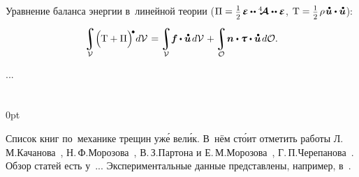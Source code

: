 \begin{otherlanguage}{russian}

Уравнение баланса энергии в~линейной теории (${\Pi = \smash{\smalldisplaystyleonehalf} \hspace{.25ex} \mathboldepsilon \hspace{-0.1ex} \dotdotp \stiffnesstensor \dotdotp \mathboldepsilon}$, ${\mathrm{T} = \smash{\smalldisplaystyleonehalf} \hspace{.25ex} \rho \hspace{.2ex} \mathdotabove{\bm{u}} \dotp \mathdotabove{\bm{u}}}$):

\nopagebreak\vspace{-0.1em}\begin{equation}
\integral\displaylimits_{\mathcal{V}} \hspace{-0.42ex} \left(^{\mathstrut} \hspace{-0.2ex} \mathrm{T} + \Pi \right)^{\hspace{-0.12em}\tikz[baseline=-0.2ex] \draw[black, fill=black] (0,0) circle (.28ex);} \hspace{-0.25ex} d\mathcal{V} \hspace{.2ex}
= \hspace{-0.1ex}
\integral\displaylimits_{\mathcal{V}} \hspace{-0.5ex} \bm{f} \hspace{-0.1ex} \dotp \mathdotabove{\bm{u}} \hspace{.25ex} d\mathcal{V} \hspace{.16ex}
+ \hspace{-0.1ex}
\integral\displaylimits_{\mathcal{O}} \hspace{-0.32ex} \bm{n} \dotp \mathboldtau \dotp \mathdotabove{\bm{u}} \hspace{.25ex} d\mathcal{O} .
\end{equation}

...



\end{otherlanguage}

\section*{\small \wordforbibliography}

\begin{changemargin}{\parindent}{0pt}
\fontsize{10}{12}\selectfont

\begin{otherlanguage}{russian}

Список книг по~механике трещин уж\'{е} вел\'{и}к. В~нём ст\'{о}ит отметить работы Л.\,М.\;Качанова~\cite{kachanov-fracturemechanics}, Н.\,Ф.\;Морозова~\cite{morozov-fractures}, В.\,З.\;Партона и Е.\,М.\;Морозова~\cite{parton.morozov-destructionofelastoplastic}, Г.\,П.\;Черепанова~\cite{cherepanov-fragilefracture}. Обзор статей есть у~... Экспериментальные данные представлены, например, в~\cite{kerstein.klyushnikov.lomakin.shesterikov-experimentalfracturemechanics}.

\end{otherlanguage}

\end{changemargin}
